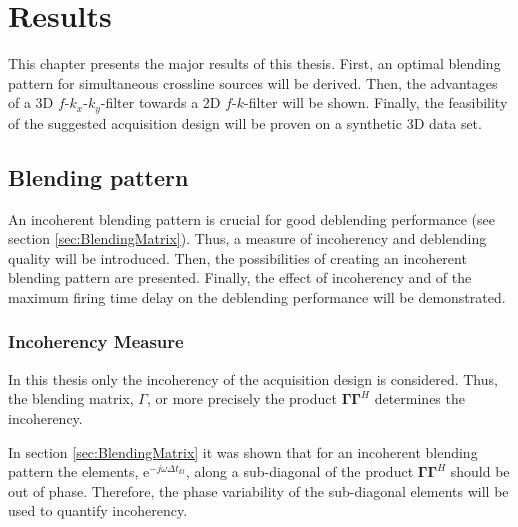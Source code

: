 \chapter{Results}

This chapter presents the major results of this thesis. First, an optimal blending pattern for simultaneous crossline sources will be derived. Then, the advantages of a 3D $f$-$k_x$-$k_y$-filter towards a 2D $f$-$k$-filter will be shown. Finally, the feasibility of the suggested acquisition design will be proven on a synthetic 3D data set. 
 
\section{Blending pattern}

An incoherent blending pattern is crucial for good deblending performance (see section \ref{sec:BlendingMatrix}). Thus, a measure of incoherency and deblending quality will be introduced. Then, the possibilities of creating an incoherent blending pattern are presented. Finally, the effect of incoherency and of the maximum firing time delay on the deblending performance will be demonstrated.

\subsection*{Incoherency Measure}

In this thesis only the incoherency of the acquisition design is considered. Thus, the blending matrix, $\Gamma$, or more precisely the product $\mathbf{\Gamma \Gamma}^H$ determines the incoherency.

In section \ref{sec:BlendingMatrix} it was shown that for an incoherent blending pattern the elements, $\mathrm{e}^{-j \omega \Delta t_{kl}}$, along a sub-diagonal of the product $\mathbf{\Gamma \Gamma}^H$ should be out of phase. Therefore, the phase variability of the sub-diagonal elements will be used to quantify incoherency.


